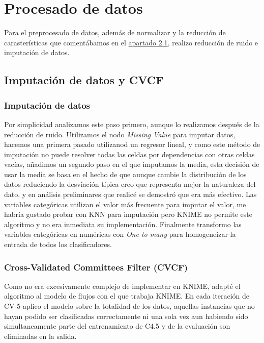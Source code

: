 \documentclass{article}
\newcommand{\img}[2]{
\noindent\makebox[\textwidth][c]{\texttt{[image: \#1]}}%
}
\begin{document}
\section{Procesado de datos}

Para el preprocesado de datos, además de normalizar y la reducción de carasterísticas que comentábamos en el \hyperref[subsec:preproc1]{apartado 2.1}, realizo reducción de ruido e imputación de datos.

\subsection{Imputación de datos y CVCF}

\subsubsection{Imputación de datos}

\img{prep1}{0.6}

Por simplicidad analizamos este paso primero, aunque lo realizamos después de la reducción de ruido. Utilizamos el nodo \textit{Missing Value} para imputar datos, hacemos una primera pasado utilizanod un regresor lineal, y como este método de imputación no puede resolver todas las celdas por dependencias con otras celdas vacías, añadimos un segundo paso en el que imputamos la media, esta decisión de usar la media se basa en el hecho de que aunque cambie la distribución de los datos reduciendo la desviación típica creo que representa mejor la naturaleza del dato, y en análisis preliminares que realicé se demostró que era más efectivo. Las variables categóricas utilizan el valor más frecuente para imputar el valor, me habría gustado probar con KNN para imputación pero KNIME no permite este algoritmo y no era inmediata su implementación. Finalmente transformo las variables categóricas en numéricas con \textit{One to many} para homogeneizar la entrada de todos los clasificadores.

\subsubsection{Cross-Validated Committees Filter (CVCF)}

Como no era excesivamente complejo de implementar en KNIME, adapté el algoritmo al modelo de flujos con el que trabaja KNIME. En cada iteración de CV-5 aplico el modelo sobre la totalidad de los datos, aquellas instancias que no hayan podido ser clasificadas correctamente ni una sola vez aun habiendo sido simultaneamente parte del entrenamiento de C4.5 y de la evaluación son eliminadas en la salida. 
\end{document}
